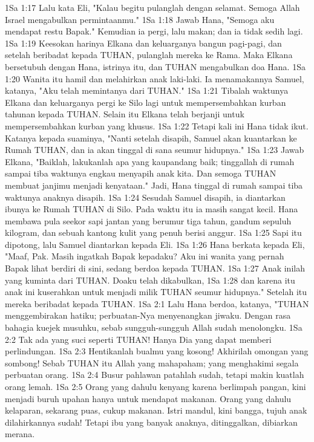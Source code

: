 1Sa 1:17  Lalu kata Eli, "Kalau begitu pulanglah dengan selamat. Semoga Allah Israel mengabulkan permintaanmu."
1Sa 1:18  Jawab Hana, "Semoga aku mendapat restu Bapak." Kemudian ia pergi, lalu makan; dan ia tidak sedih lagi.
1Sa 1:19  Keesokan harinya Elkana dan keluarganya bangun pagi-pagi, dan setelah beribadat kepada TUHAN, pulanglah mereka ke Rama. Maka Elkana bersetubuh dengan Hana, istrinya itu, dan TUHAN mengabulkan doa Hana.
1Sa 1:20  Wanita itu hamil dan melahirkan anak laki-laki. Ia menamakannya Samuel, katanya, "Aku telah memintanya dari TUHAN."
1Sa 1:21  Tibalah waktunya Elkana dan keluarganya pergi ke Silo lagi untuk mempersembahkan kurban tahunan kepada TUHAN. Selain itu Elkana telah berjanji untuk mempersembahkan kurban yang khusus.
1Sa 1:22  Tetapi kali ini Hana tidak ikut. Katanya kepada suaminya, "Nanti setelah disapih, Samuel akan kuantarkan ke Rumah TUHAN, dan ia akan tinggal di sana seumur hidupnya."
1Sa 1:23  Jawab Elkana, "Baiklah, lakukanlah apa yang kaupandang baik; tinggallah di rumah sampai tiba waktunya engkau menyapih anak kita. Dan semoga TUHAN membuat janjimu menjadi kenyataan." Jadi, Hana tinggal di rumah sampai tiba waktunya anaknya disapih.
1Sa 1:24  Sesudah Samuel disapih, ia diantarkan ibunya ke Rumah TUHAN di Silo. Pada waktu itu ia masih sangat kecil. Hana membawa pula seekor sapi jantan yang berumur tiga tahun, gandum sepuluh kilogram, dan sebuah kantong kulit yang penuh berisi anggur.
1Sa 1:25  Sapi itu dipotong, lalu Samuel diantarkan kepada Eli.
1Sa 1:26  Hana berkata kepada Eli, "Maaf, Pak. Masih ingatkah Bapak kepadaku? Aku ini wanita yang pernah Bapak lihat berdiri di sini, sedang berdoa kepada TUHAN.
1Sa 1:27  Anak inilah yang kuminta dari TUHAN. Doaku telah dikabulkan,
1Sa 1:28  dan karena itu anak ini kuserahkan untuk menjadi milik TUHAN seumur hidupnya." Setelah itu mereka beribadat kepada TUHAN.
1Sa 2:1  Lalu Hana berdoa, katanya, "TUHAN menggembirakan hatiku; perbuatan-Nya menyenangkan jiwaku. Dengan rasa bahagia kuejek musuhku, sebab sungguh-sungguh Allah sudah menolongku.
1Sa 2:2  Tak ada yang suci seperti TUHAN! Hanya Dia yang dapat memberi perlindungan.
1Sa 2:3  Hentikanlah bualmu yang kosong! Akhirilah omongan yang sombong! Sebab TUHAN itu Allah yang mahapaham; yang menghakimi segala perbuatan orang.
1Sa 2:4  Busur pahlawan patahlah sudah, tetapi makin kuatlah orang lemah.
1Sa 2:5  Orang yang dahulu kenyang karena berlimpah pangan, kini menjadi buruh upahan hanya untuk mendapat makanan. Orang yang dahulu kelaparan, sekarang puas, cukup makanan. Istri mandul, kini bangga, tujuh anak dilahirkannya sudah! Tetapi ibu yang banyak anaknya, ditinggalkan, dibiarkan merana.
